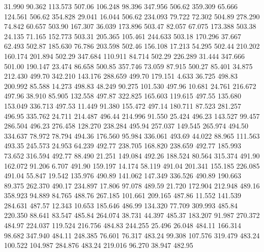   31.990   90.362  113.573       507.06
 106.248   98.396  347.956       506.62
 359.309   65.666  124.561       506.62
 354.828   29.041   16.044       506.62
 234.093   79.722   72.302       504.89
 278.290   74.842   60.657       503.90
 167.307   36.039  173.896       503.47
  82.057   67.075  173.388       503.38
  24.135   71.165  152.773       503.31
 205.365  105.461  244.633       503.18
 170.296   37.667   62.493       502.87
 185.630   76.786  203.598       502.46
 156.108   17.213   54.295       502.44
 210.202  160.174  201.894       502.29
 347.684  110.911   84.714       502.29
 226.289   31.444  347.666       501.00
 190.147   23.474   86.658       500.85
 357.746   73.059   87.915       500.27
  85.401   34.875  212.430       499.70
 342.210  143.176  288.659       499.70
 179.151    4.633   36.725       498.83
 200.992   85.588   14.273       498.83
  48.249   90.275  101.530       497.96
  10.681   24.761  216.672       497.96
  38.910   85.905  132.558       497.87
 322.825  165.603  119.615       497.55
 135.680  153.049  336.713       497.53
  11.449   91.380  155.472       497.14
 180.711   87.523  281.257       496.95
 335.762   24.711  214.487       496.44
 214.996   91.550   25.424       496.23
 143.527   99.457  286.504       496.23
 276.458  128.270  238.284       495.94
 257.037  149.545  265.974       494.50
 334.637   78.972   78.794       494.36
 176.560   95.984  336.061       493.69
  44.022   88.965  111.563       493.35
 245.573   24.953   64.239       492.77
 238.705  168.820  238.659       492.77
 185.993   73.652  316.594       492.77
  88.490   21.251  149.084       492.26
 188.524   80.564  315.374       491.90
 162.072   91.206    6.707       491.90
 159.197   14.174   58.119       491.04
 201.341  155.185  226.085       491.04
  55.847   19.542  135.976       490.89
 141.062  147.349  336.526       490.89
 190.663   89.375  262.370       490.17
 234.897   17.806   97.078       489.59
  21.720  172.904  212.948       489.16
 358.923   94.889   84.765       488.76
 267.185  101.661  209.165       487.86
  11.552  141.539  284.631       487.57
  12.343   10.653  185.646       486.99
 134.320   77.709  309.993       485.84
 220.350   88.641   83.547       485.84
 264.074   38.731   44.397       485.37
 183.207   91.987  270.372       484.97
 224.037  119.524  216.756       484.83
 244.255   25.496   26.048       484.11
 166.314   98.682  347.940       484.11
 248.385   76.601   76.317       483.24
  99.308  107.576  319.479       483.24
 100.522  104.987  284.876       483.24
 219.016   96.270   38.947       482.95
